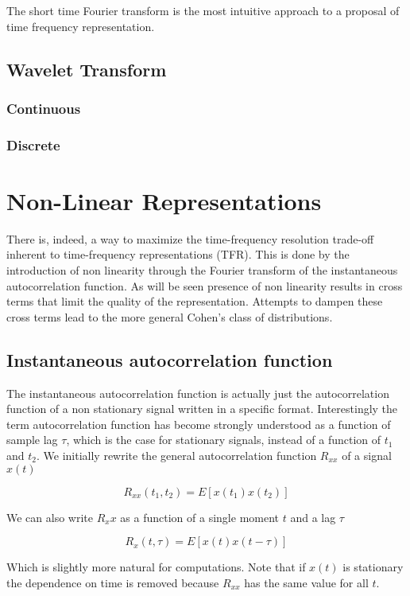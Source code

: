 The short time Fourier transform is the most intuitive approach to a proposal
of time frequency representation.

\subsection{Wavelet Transform}

\subsubsection{Continuous}

\subsubsection{Discrete}

\section{Non-Linear Representations}

There is, indeed, a way to maximize the time-frequency resolution trade-off
inherent to time-frequency representations (TFR). This is done by the
introduction of non linearity through the Fourier transform of the
instantaneous autocorrelation function. As will be seen presence of non
linearity results in cross terms that limit the quality of the representation.
Attempts to dampen these cross terms lead to the more general Cohen's class of
distributions.

\subsection{Instantaneous autocorrelation function}

The instantaneous autocorrelation function is actually just the autocorrelation
function of a non stationary signal written in a specific format.
Interestingly the term autocorrelation function has become strongly understood
as a function of sample lag $\tau$, which is the case for stationary signals,
instead of a function of $t_1$ and $t_2$. We initially rewrite the general
autocorrelation function $R_{xx}$ of a signal $x(t)$

$$ R_{xx}(t_1, t_2) = E[x(t_1)x(t_2)] $$

We can also write $R_xx$ as a function of a single moment $t$ and a lag $\tau$

$$ R_{x}(t, \tau) = E[x(t)x(t-\tau)] $$

Which is slightly more natural for computations. Note that if $x(t)$ is
stationary the dependence on time is removed because $R_{xx}$ has the same
value for all $t$.

